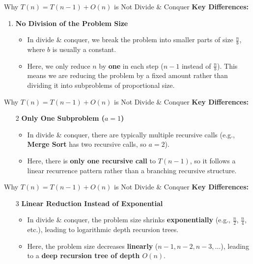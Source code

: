\documentclass[aspectratio=169]{beamer}
\begin{document}
\begin{frame}{Why $T(n) = T(n-1) + O(n)$ is Not Divide \& Conquer}
    \textbf{Key Differences:}
    \begin{enumerate}
        \item \textbf{No Division of the Problem Size}
        \begin{itemize}
            \item In divide \& conquer, we break the problem into smaller parts of size $\frac{n}{b}$, where $b$ is usually a constant.
            \item Here, we only reduce $n$ by \textbf{one} in each step ($n - 1$ instead of $\frac{n}{b}$). This means we are reducing the problem by a fixed amount rather than dividing it into subproblems of proportional size.
        \end{itemize}
    \end{enumerate}
\end{frame}

\begin{frame}{Why $T(n) = T(n-1) + O(n)$ is Not Divide \& Conquer}
    \textbf{Key Differences:}
    \begin{enumerate}
        \item[2] \textbf{Only One Subproblem ($a = 1$)}
        \begin{itemize}
            \item In divide \& conquer, there are typically multiple recursive calls (e.g., \textbf{Merge Sort} has two recursive calls, so $a = 2$).
            \item Here, there is \textbf{only one recursive call} to $T(n - 1)$, so it follows a linear recurrence pattern rather than a branching recursive structure.
        \end{itemize}
    \end{enumerate}
\end{frame}

\begin{frame}{Why $T(n) = T(n - 1) + O(n)$ is Not Divide \& Conquer}
    \textbf{Key Differences:}
    \begin{enumerate}
        \item[3] \textbf{Linear Reduction Instead of Exponential}
        \begin{itemize}
            \item In divide \& conquer, the problem size shrinks \textbf{exponentially} (e.g., $\frac{n}{2}$, $\frac{n}{4}$, etc.), leading to logarithmic depth recursion trees.
            \item Here, the problem size decreases \textbf{linearly} ($n - 1, n - 2, n - 3, \dots$), leading to a \textbf{deep recursion tree of depth $O(n)$}.
        \end{itemize}
    \end{enumerate}
\end{frame}
\end{document}
